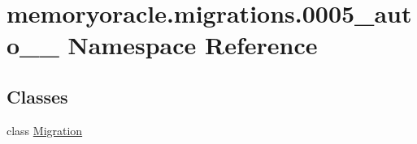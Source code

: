\hypertarget{namespacememoryoracle_1_1migrations_1_10005__auto__20150403__0100}{}\section{memoryoracle.\+migrations.0005\+\_\+auto\+\_\+\_ Namespace Reference}
\label{namespacememoryoracle_1_1migrations_1_10005__auto__20150403__0100}
\subsection*{Classes}
\begin{DoxyCompactItemize}
\item 
class \hyperlink{classmemoryoracle_1_1migrations_1_10005__auto__20150403__0100_1_1Migration}{Migration}
\end{DoxyCompactItemize}

